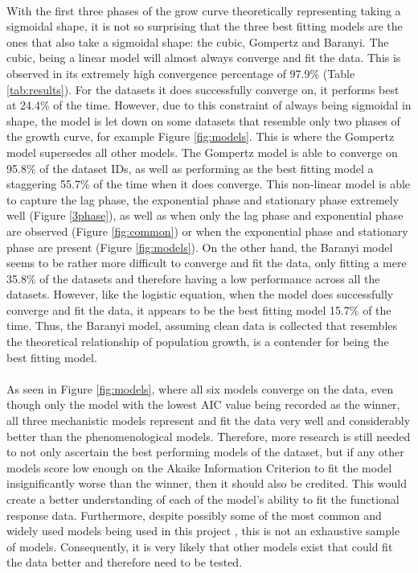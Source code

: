 \documentclass[11pt, a4paper]{article} %
\begin{document}
\paragraph{} With the first three phases of the grow curve theoretically representing taking a sigmoidal shape, it is not so surprising that the three best fitting models are the ones that also take a sigmoidal shape: the cubic, Gompertz and Baranyi. The cubic, being a linear model will almost always converge and fit the data. This is observed in its extremely high convergence percentage of 97.9\% (Table \ref{tab:results}). For the datasets it does successfully converge on, it performs best at 24.4\% of the time. However, due to this constraint of always being sigmoidal in shape, the model is let down on some datasets that resemble only two phases of the growth curve, for example Figure \ref{fig:models}. This is where the Gompertz model supersedes all other models. The Gompertz model is able to converge on 95.8\% of the dataset IDs, as well as performing as the best fitting model a staggering 55.7\% of the time when it does converge. This non-linear model is able to capture the lag phase, the exponential phase and stationary phase extremely well (Figure \ref{3phase}), as well as when only the lag phase and exponential phase are observed (Figure \ref{fig:common}) or when the exponential phase and stationary phase are present (Figure \ref{fig:models}). On the other hand, the Baranyi model seems to be rather more difficult to converge and fit the data, only fitting a mere 35.8\% of the datasets and therefore having a low performance across all the datasets. However, like the logistic equation, when the model does successfully converge and fit the data, it appears to be the best fitting model 15.7\% of the time. Thus, the Baranyi model, assuming clean data is collected that resembles the theoretical relationship of population growth, is a contender for being the best fitting model. 

\paragraph{} As seen in Figure \ref{fig:models}, where all six models converge on the data, even though only the model with the lowest AIC value being recorded as the winner, all three mechanistic models represent and fit the data very well and considerably better than the phenomenological models. Therefore, more research is still needed to not only ascertain the best performing models of the dataset, but if any other models score low enough on the Akaike Information Criterion to fit the model insignificantly worse than the winner, then it should also be credited. This would create a better understanding of each of the model's ability to fit the functional response data. Furthermore, despite possibly some of the most common and widely used models being used in this project \citep{RN108, RN105}, this is not an exhaustive sample of models. Consequently, it is very likely that other models exist that could fit the data better and therefore need to be tested.
 
\end{document}
